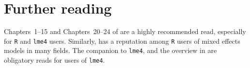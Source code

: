 \documentclass[a4paper,12pt]{article}
\begin{document}


\section{Further reading}
\label{sec:furtherreading}

Chapters~1--15 and Chapters~20--24 of \citet{GelmanHill2006} are a highly recommended read, especially for \texttt{R} and \texttt{lme4} users.
Similarly, \citet{ZuurEa2009} has a reputation among \texttt{R} users of mixed effects models in many fields.
The companion to \texttt{lme4}, \citet{Bates2010} and the overview in \citet{BatesEa2015} are obligatory reads for users of \texttt{lme4}.

\printbibliography
\end{document}
